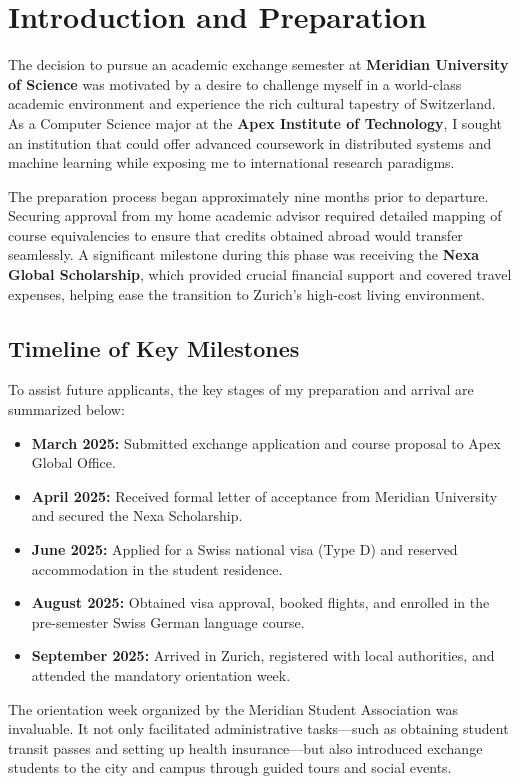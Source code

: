 \section{Introduction and Preparation}
\label{sec:introduction}

The decision to pursue an academic exchange semester at \textbf{Meridian University of Science} was motivated by a desire to challenge myself in a world-class academic environment and experience the rich cultural tapestry of Switzerland. As a Computer Science major at the \textbf{Apex Institute of Technology}, I sought an institution that could offer advanced coursework in distributed systems and machine learning while exposing me to international research paradigms.

The preparation process began approximately nine months prior to departure. Securing approval from my home academic advisor required detailed mapping of course equivalencies to ensure that credits obtained abroad would transfer seamlessly. A significant milestone during this phase was receiving the \textbf{Nexa Global Scholarship}, which provided crucial financial support and covered travel expenses, helping ease the transition to Zurich's high-cost living environment.

\subsection{Timeline of Key Milestones}
To assist future applicants, the key stages of my preparation and arrival are summarized below:

\vspace{5pt}
\begin{tcolorbox}[
  colback=lightgray,
  colframe=bordergray,
  arc=4pt,
  boxrule=1pt,
  title=\sffamily\bfseries\color{primarycolor}Preparation Chronology
]
  \begin{itemize}[label=\textcolor{accentcolor}{\faCheckCircle}]
    \item \textbf{March 2025:} Submitted exchange application and course proposal to Apex Global Office.
    \item \textbf{April 2025:} Received formal letter of acceptance from Meridian University and secured the Nexa Scholarship.
    \item \textbf{June 2025:} Applied for a Swiss national visa (Type D) and reserved accommodation in the student residence.
    \item \textbf{August 2025:} Obtained visa approval, booked flights, and enrolled in the pre-semester Swiss German language course.
    \item \textbf{September 2025:} Arrived in Zurich, registered with local authorities, and attended the mandatory orientation week.
  \end{itemize}
\end{tcolorbox}
\vspace{5pt}

The orientation week organized by the Meridian Student Association was invaluable. It not only facilitated administrative tasks---such as obtaining student transit passes and setting up health insurance---but also introduced exchange students to the city and campus through guided tours and social events.
